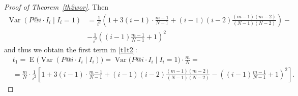 \documentclass{tpms-l}
\theoremstyle{definition}
\theoremstyle{remark}
\numberwithin{equation}{section}
\begin{document}
\begin{proof}[Proof of Theorem~\ref {th2wor}]
Then \begin{equation*}
\begin{split} 
\operatorname{Var}(P@i\cdot I_i \mid I_i=1)&=\frac{1}{i^2}\left(1+3(i-1)\cdot \frac{m-1}{N-1}+
(i-1)(i-2)\frac{(m-1)(m-2)}{(N-1)(N-2)}\right)-\\
&-\frac{1}{i^2}\left((i-1)\frac{m-1}{N-1}+1 \right)^2
\end{split} 
\end{equation*}
and thus we obtain the first term in \eqref{t1t2}: 
\begin{equation*}
\begin{split} &t_1=\operatorname{E}\big(\operatorname{Var}(P@i\cdot I_i \mid I_i)\big)=\operatorname{Var}\big(P@i\cdot I_i \mid I_i=1\big)\cdot \frac{m}{N}=\\
&=\frac{m}{N} \cdot \frac{1}{i^2} \left[1+3(i-1)\cdot \frac{m-1}{N-1}+
(i-1)(i-2)\frac{(m-1)(m-2)}{(N-1)(N-2)}-((i-1)\frac{m-1}{N-1}+1)^2 \right].
\end{split}
\end{equation*}


\end{proof}
\end{document}
